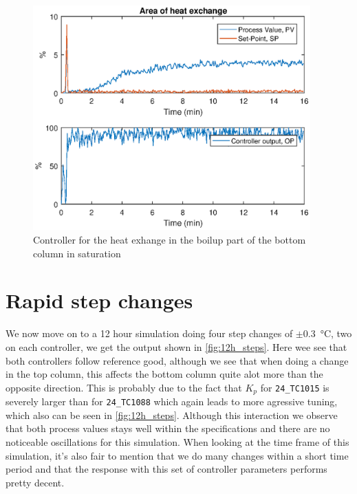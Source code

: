 \begin{figure}[ht!]
	\centering
	\includegraphics[width=0.95\textwidth]{fig/results/lc1028_saturated.eps}
	\caption{Controller for the heat exhange in the boilup part of the bottom column in saturation}
	\label{fig:lc1028_saturated}
\end{figure}

\clearpage
\section{Rapid step changes}
We now move on to a 12 hour simulation doing four step changes of $\pm$\SI{0.3}{\degreeCelsius}, two on each controller, we get the output shown in \autoref{fig:12h_steps}. Here wee see that both controllers follow reference good, although we see that when doing a change in the top column, this affects the bottom column quite alot more than the opposite direction. This is probably due to the fact that $K_p$ for \texttt{24\_TC1015} is severely larger than for \texttt{24\_TC1088} which again leads to more agressive tuning, which also can be seen in \autoref{fig:12h_steps}. Although this interaction we observe that both process values stays well within the specifications and there are no noticeable oscillations for this simulation. When looking at the time frame of this simulation, it's also fair to mention that we do many changes within a short time period and that the response with this set of controller parameters performs pretty decent.

